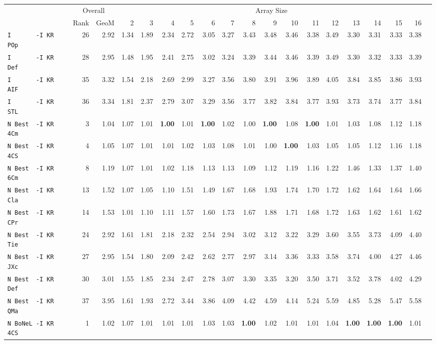 \begin{tabular}{l | r @{~~} r | r@{~~}r@{~~}r@{~~}r@{~~}r@{~~}r@{~~}r@{~~}r@{~~}r@{~~}r@{~~}r@{~~}r@{~~}r@{~~}r@{~~}r@{~~}r|}
 & \multicolumn{2}{c|}{Overall} & \multicolumn{15}{c}{Array Size} \\
 & Rank & GeoM & 2&3&4&5&6&7&8&9&10&11&12&13&14&15&16\\ \hline
\verb+I       -I KR POp+ & 26 & 2.92 & 1.34&1.89&2.34&2.72&3.05&3.27&3.43&3.48&3.46&3.38&3.49&3.30&3.31&3.33&3.38\\
\verb+I       -I KR Def+ & 28 & 2.95 & 1.48&1.95&2.41&2.75&3.02&3.24&3.39&3.44&3.46&3.39&3.49&3.30&3.32&3.33&3.39\\
\verb+I       -I KR AIF+ & 35 & 3.32 & 1.54&2.18&2.69&2.99&3.27&3.56&3.80&3.91&3.96&3.89&4.05&3.84&3.85&3.86&3.93\\
\verb+I       -I KR STL+ & 36 & 3.34 & 1.81&2.37&2.79&3.07&3.29&3.56&3.77&3.82&3.84&3.77&3.93&3.73&3.74&3.77&3.84\smallskip \\
\verb+N Best  -I KR 4Cm+ & 3 & 1.04 & 1.07&1.01&\textbf{1.00}&1.01&\textbf{1.00}&1.02&1.00&\textbf{1.00}&1.08&\textbf{1.00}&1.01&1.03&1.08&1.12&1.18\\
\verb+N Best  -I KR 4CS+ & 4 & 1.05 & 1.07&1.01&1.01&1.02&1.03&1.08&1.01&1.00&\textbf{1.00}&1.03&1.05&1.05&1.12&1.16&1.18\\
\verb+N Best  -I KR 6Cm+ & 8 & 1.19 & 1.07&1.01&1.02&1.18&1.13&1.13&1.09&1.12&1.19&1.16&1.22&1.46&1.33&1.37&1.40\\
\verb+N Best  -I KR Cla+ & 13 & 1.52 & 1.07&1.05&1.10&1.51&1.49&1.67&1.68&1.93&1.74&1.70&1.72&1.62&1.64&1.64&1.66\\
\verb+N Best  -I KR CPr+ & 14 & 1.53 & 1.01&1.10&1.11&1.57&1.60&1.73&1.67&1.88&1.71&1.68&1.72&1.63&1.62&1.61&1.62\\
\verb+N Best  -I KR Tie+ & 24 & 2.92 & 1.61&1.81&2.18&2.32&2.54&2.94&3.02&3.12&3.22&3.29&3.60&3.55&3.73&4.09&4.40\\
\verb+N Best  -I KR JXc+ & 27 & 2.95 & 1.54&1.80&2.09&2.42&2.62&2.77&2.97&3.14&3.36&3.33&3.58&3.74&4.00&4.27&4.46\\
\verb+N Best  -I KR Def+ & 30 & 3.01 & 1.55&1.85&2.34&2.47&2.78&3.07&3.30&3.35&3.20&3.50&3.71&3.52&3.78&4.02&4.29\\
\verb+N Best  -I KR QMa+ & 37 & 3.95 & 1.61&1.93&2.72&3.44&3.86&4.09&4.42&4.59&4.14&5.24&5.59&4.85&5.28&5.47&5.58\smallskip \\
\verb+N BoNeL -I KR 4CS+ & 1 & 1.02 & 1.07&1.01&1.01&1.01&1.03&1.03&\textbf{1.00}&1.02&1.01&1.01&1.04&\textbf{1.00}&\textbf{1.00}&\textbf{1.00}&1.01\\

\end{tabular}
